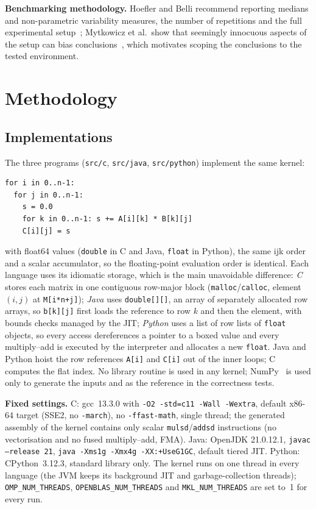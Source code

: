 \documentclass[conference,a4paper]{IEEEtran}
\begin{document}
\textbf{Benchmarking methodology.} Hoefler and Belli recommend reporting medians and non-parametric variability
measures, the number of repetitions and the full experimental setup~\cite{hoefler2015}; Mytkowicz et al.\ show that
seemingly innocuous aspects of the setup can bias conclusions~\cite{mytkowicz2009}, which motivates scoping the
conclusions to the tested environment.

\section{Methodology}
\label{sec:method}

\subsection{Implementations}
The three programs (\texttt{src/c}, \texttt{src/java}, \texttt{src/python}) implement the same kernel:
\begin{lstlisting}
for i in 0..n-1:
  for j in 0..n-1:
    s = 0.0
    for k in 0..n-1: s += A[i][k] * B[k][j]
    C[i][j] = s
\end{lstlisting}
with float64 values (\texttt{double} in C and Java, \texttt{float} in Python), the same ijk order and a scalar
accumulator, so the floating-point evaluation order is identical. Each language uses its idiomatic storage, which
is the main unavoidable difference: \emph{C} stores each matrix in one contiguous row-major block
(\texttt{malloc}/\texttt{calloc}, element $(i,j)$ at \texttt{M[i*n+j]}); \emph{Java} uses \texttt{double[][]}, an
array of separately allocated row arrays, so \texttt{b[k][j]} first loads the reference to row $k$ and then the
element, with bounds checks managed by the JIT; \emph{Python} uses a list of row lists of \texttt{float} objects, so
every access dereferences a pointer to a boxed value and every multiply--add is executed by the interpreter and
allocates a new \texttt{float}. Java and Python hoist the row references \texttt{A[i]} and \texttt{C[i]} out of
the inner loops; C computes the flat index. No library routine is used in any kernel; NumPy~\cite{harris2020} is
used only to generate the inputs and as the reference in the correctness tests.

\textbf{Fixed settings.} C: gcc~13.3.0 with \texttt{-O2 -std=c11 -Wall -Wextra}, default x86-64 target (SSE2, no
\texttt{-march}), no \texttt{-ffast-math}, single thread; the generated assembly of the kernel contains only scalar
\texttt{mulsd}/\texttt{addsd} instructions (no vectorisation and no fused multiply--add, FMA). Java: OpenJDK
21.0.12.1, \texttt{javac --release 21}, \texttt{java -Xms1g -Xmx4g -XX:+UseG1GC}, default tiered JIT. Python:
CPython~3.12.3, standard library only. The kernel runs on one thread in every language (the JVM keeps its
background JIT and garbage-collection threads); \texttt{OMP\_NUM\_THREADS}, \texttt{OPENBLAS\_NUM\_THREADS} and
\texttt{MKL\_NUM\_THREADS} are set to~1 for every run.
\end{document}
